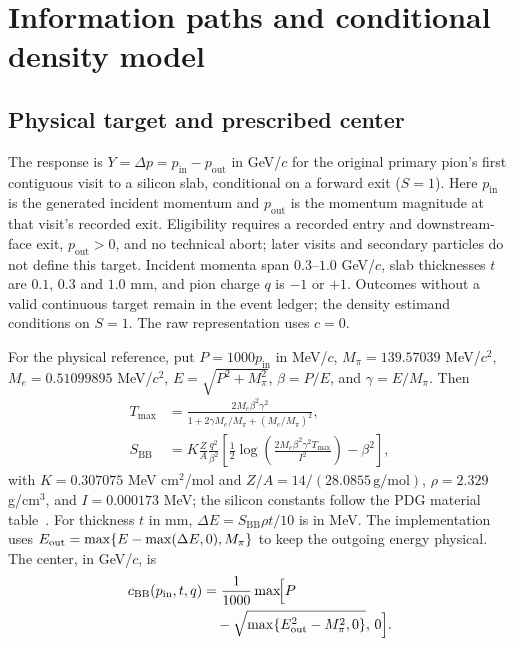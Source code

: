 \documentclass[twocolumn,epjc3]{svjour3}
\newcommand{\pin}{p_{\mathrm{in}}}
\newcommand{\pout}{p_{\mathrm{out}}}
\begin{document}


\section{Information paths and conditional density model}
\label{sec:model}

\subsection{Physical target and prescribed center}

The response is $Y=\Delta p=\pin-\pout$ in GeV/$c$ for the original
primary pion's first contiguous visit to a silicon slab, conditional on a
forward exit ($S=1$). Here $\pin$ is the generated incident momentum and
$\pout$ is the momentum magnitude at that visit's recorded exit. Eligibility
requires a recorded entry and downstream-face exit, $\pout>0$, and no
technical abort; later visits and secondary particles do not define this
target. Incident momenta span $0.3$--$1.0$ GeV/$c$, slab thicknesses $t$ are
$0.1$, $0.3$ and $1.0$ mm, and pion charge $q$ is $-1$ or $+1$.
Outcomes without a valid continuous target remain in the event ledger;
the density estimand conditions on $S=1$. The raw representation uses $c=0$.

For the physical reference, put $P=1000\pin$ in MeV/$c$,
$M_\pi=139.57039$ MeV/$c^2$, $M_e=0.51099895$ MeV/$c^2$,
$E=\sqrt{P^2+M_\pi^2}$, $\beta=P/E$, and $\gamma=E/M_\pi$. Then
\begin{align}
 T_{\max} &= \frac{2M_e\beta^2\gamma^2}
 {1+2\gamma M_e/M_\pi+(M_e/M_\pi)^2},\\
 S_{\mathrm{BB}} &= K\frac{Z}{A}\frac{q^2}{\beta^2}
 \left[\frac12\log\!\left(\frac{2M_e\beta^2\gamma^2T_{\max}}{I^2}\right)-\beta^2\right],
\end{align}
with $K=0.307075$ MeV cm$^2$/mol and $Z/A=14/(28.0855\,\mathrm{g/mol})$,
$\rho=2.329$ g/cm$^3$, and $I=0.000173$ MeV; the silicon constants follow the
PDG material table~\cite{PDGSilicon2025}. For thickness $t$ in mm,
$\Delta E=S_{\mathrm{BB}}\rho t/10$ is in MeV. The implementation uses
$E_{\rm out}=\max\{E-\max(\Delta E,0),M_\pi\}$ to keep the outgoing
energy physical. The center, in GeV/$c$, is
\begin{equation}
 \begin{aligned}
  c_{\mathrm{BB}}(\pin,t,q) &= \frac{1}{1000}\max\!\Bigl[P \\
  &\quad -\sqrt{\max\{E_{\rm out}^2-M_\pi^2,0\}},\,0\Bigr].
 \end{aligned}
\end{equation}
\end{document}
